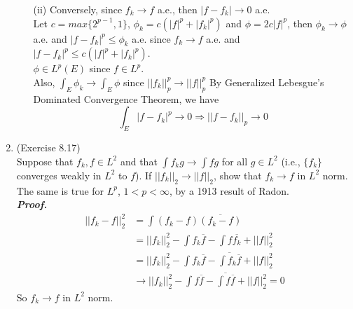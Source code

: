 \documentclass[a4paper,11pt]{article}
\begin{document}
\begin{enumerate}
\begin{enumerate}
	 	\item [(ii)]
	 		Conversely, since $f_k \to f$ a.e., then $|f - f_k| \to 0$ a.e.\\
	 		Let $c = max\{2^{p-1}, 1\}$, $\phi_k = c(|f|^p + |f_k|^p)$ and $\phi = 2c|f|^p$, then $\phi_k \to \phi$ a.e. and $|f - f_k|^p \leq \phi_k$ a.e. since $f_k \to f$ a.e. and $|f - f_k|^p \leq c(|f|^p + |f_k|^p )$.\\
	 		$\phi \in L^p(E)$ since $f \in L^p$.\\
	 		Also, $\int_E \phi_k \to \int_E \phi$ since $||f_k||_p^p \to ||f||_p^p$
	 		By Generalized Lebesgue's Dominated Convergence Theorem, we have
	 			$$\int_E |f - f_k|^p \to 0 \Rightarrow ||f - f_k||_p \to 0$$

 	 \end{enumerate}

	\item (Exercise 8.17)\\
		Suppose that $f_k, f \in L^2$ and that $\int f_k g \to \int fg$ for all $g \in L^2$ (i.e., $\{ f_k \}$ converges weakly in $L^2$ to $f$). If $||f_k||_2 \to ||f||_2$, show that $f_k \to f$ in $L^2$ norm. The same is true for $L^p$, $1 < p < \infty$, by a 1913 result of Radon.\\
	\newline
 	\textit{\textbf {Proof.}}\\
 		$$\begin{aligned}
 		||f_k - f||_2^2
 		&= \int (f_k - f) \overline{(f_k - f)}\\
 		&= ||f_k||_2^2 - \int f_k \overline{f} - \int f \overline{f_k} + ||f||_2^2\\
 		&= ||f_k||_2^2 - \int f_k \overline{f} - \overline{\int f_k \overline{f}} + ||f||_2^2\\
 		&\to ||f_k||_2^2 - \int f \overline{f} - \overline{\int f \overline{f}} + ||f||_2^2 = 0
 		\end{aligned}$$
 		So $f_k \to f$ in $L^2$ norm.\\



\end{enumerate}
\end{document}
